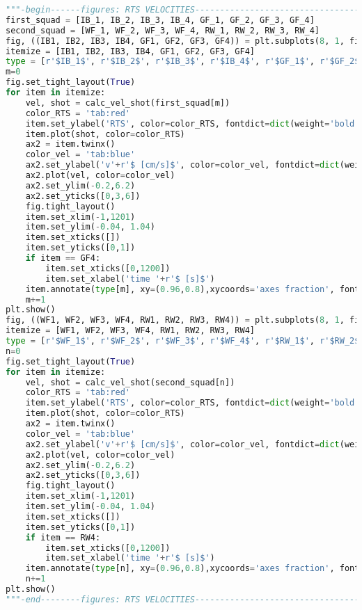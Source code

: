 \begin{lstlisting}[language=Python, basicstyle=\tiny, frame=single, keywordstyle=\color{teal}, commentstyle=\color{olive}, stringstyle=\color{red}]
"""-begin------figures: RTS VELOCITIES---------------------------------------"""
first_squad = [IB_1, IB_2, IB_3, IB_4, GF_1, GF_2, GF_3, GF_4]
second_squad = [WF_1, WF_2, WF_3, WF_4, RW_1, RW_2, RW_3, RW_4]
fig, ((IB1, IB2, IB3, IB4, GF1, GF2, GF3, GF4)) = plt.subplots(8, 1, figsize=(10,10))
itemize = [IB1, IB2, IB3, IB4, GF1, GF2, GF3, GF4]
type = [r'$IB_1$', r'$IB_2$', r'$IB_3$', r'$IB_4$', r'$GF_1$', r'$GF_2$', r'$GF_3$', r'$GF_4$']
m=0
fig.set_tight_layout(True)
for item in itemize:
    vel, shot = calc_vel_shot(first_squad[m])
    color_RTS = 'tab:red'
    item.set_ylabel('RTS', color=color_RTS, fontdict=dict(weight='bold'))
    item.plot(shot, color=color_RTS)
    ax2 = item.twinx()
    color_vel = 'tab:blue'
    ax2.set_ylabel('v'+r'$ [cm/s]$', color=color_vel, fontdict=dict(weight='bold'))
    ax2.plot(vel, color=color_vel)
    ax2.set_ylim(-0.2,6.2)
    ax2.set_yticks([0,3,6])
    fig.tight_layout()
    item.set_xlim(-1,1201)
    item.set_ylim(-0.04, 1.04)
    item.set_xticks([])
    item.set_yticks([0,1])
    if item == GF4:
        item.set_xticks([0,1200])
        item.set_xlabel('time '+r'$ [s]$')
    item.annotate(type[m], xy=(0.96,0.8),xycoords='axes fraction', fontsize=10)
    m+=1
plt.show()
fig, ((WF1, WF2, WF3, WF4, RW1, RW2, RW3, RW4)) = plt.subplots(8, 1, figsize=(10,10))
itemize = [WF1, WF2, WF3, WF4, RW1, RW2, RW3, RW4]
type = [r'$WF_1$', r'$WF_2$', r'$WF_3$', r'$WF_4$', r'$RW_1$', r'$RW_2$', r'$RW_3$', r'$RW_4$']
n=0
fig.set_tight_layout(True)
for item in itemize:
    vel, shot = calc_vel_shot(second_squad[n])
    color_RTS = 'tab:red'
    item.set_ylabel('RTS', color=color_RTS, fontdict=dict(weight='bold'))
    item.plot(shot, color=color_RTS)
    ax2 = item.twinx()
    color_vel = 'tab:blue'
    ax2.set_ylabel('v'+r'$ [cm/s]$', color=color_vel, fontdict=dict(weight='bold'))
    ax2.plot(vel, color=color_vel)
    ax2.set_ylim(-0.2,6.2)
    ax2.set_yticks([0,3,6])
    fig.tight_layout()
    item.set_xlim(-1,1201)
    item.set_ylim(-0.04, 1.04)
    item.set_xticks([])
    item.set_yticks([0,1])
    if item == RW4:
        item.set_xticks([0,1200])
        item.set_xlabel('time '+r'$ [s]$')
    item.annotate(type[n], xy=(0.96,0.8),xycoords='axes fraction', fontsize=10)
    n+=1
plt.show()
"""-end--------figures: RTS VELOCITIES---------------------------------------"""


\end{lstlisting}
